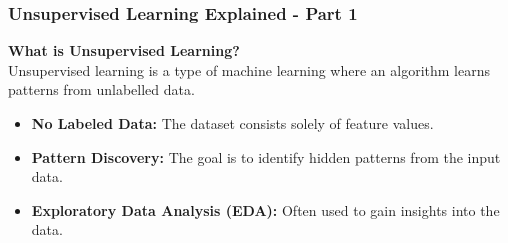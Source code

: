 \documentclass[aspectratio=169]{beamer}
\begin{document}
\begin{frame}[fragile]
    \frametitle{Unsupervised Learning Explained - Part 1}
    \textbf{What is Unsupervised Learning?} \\
    Unsupervised learning is a type of machine learning where an algorithm learns patterns from unlabelled data.
    
    \begin{itemize}
        \item \textbf{No Labeled Data:} The dataset consists solely of feature values.
        \item \textbf{Pattern Discovery:} The goal is to identify hidden patterns from the input data.
        \item \textbf{Exploratory Data Analysis (EDA):} Often used to gain insights into the data.
    \end{itemize}
\end{frame}
\end{document}
